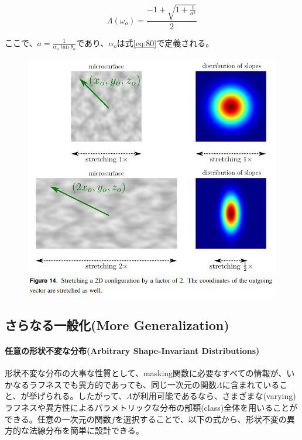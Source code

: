 \documentclass[a4j,xelatex,ja=standard]{bxjsarticle}
\begin{document}
\begin{equation}
    \Lambda(\omega_o) = \frac{-1 + \sqrt{1 + \frac{1}{a^2}}}{2}
    \label{eq:86}
\end{equation}

ここで、$a = \frac{1}{\alpha_o \tan\theta_o}$であり、$\alpha_o$は式\eqref{eq:80}で定義される。

\begin{figure}
    \includegraphics[width=\textwidth]{Figure14.png}
    \caption{}
    \label{fig:14}
\end{figure}

\subsection{さらなる一般化(More Generalization)}

\paragraph{任意の形状不変な分布(Arbitrary Shape-Invariant Distributions)}

形状不変な分布の大事な性質として、masking関数に必要なすべての情報が、いかなるラフネスでも異方的であっても、同じ一次元の関数$\Lambda$に含まれていること、が挙げられる。したがって、$\Lambda$が利用可能であるなら、さまざまな(varying)ラフネスや異方性によるパラメトリックな分布の部類(class)全体を用いることができる。任意の一次元の関数$f$を選択することで、以下の式から、形状不変の異方的な法線分布を簡単に設計できる。
\end{document}
